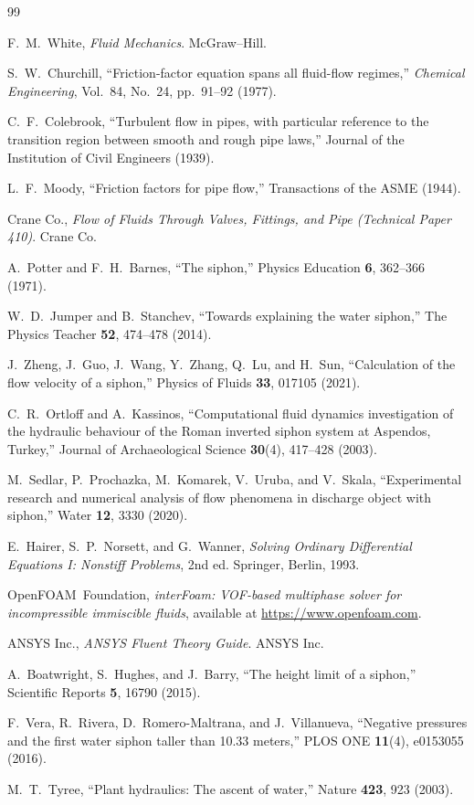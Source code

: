 \documentclass[11pt]{article}
\begin{document}
\begin{thebibliography}{99}

F.~M.~White,
\emph{Fluid Mechanics}.
McGraw--Hill.


S.~W.~Churchill,
``Friction-factor equation spans all fluid-flow regimes,''
\emph{Chemical Engineering}, Vol.~84, No.~24, pp.~91--92 (1977).


C.~F.~Colebrook,
``Turbulent flow in pipes, with particular reference to the transition region
between smooth and rough pipe laws,''
Journal of the Institution of Civil Engineers (1939).

L.~F.~Moody,
``Friction factors for pipe flow,''
Transactions of the ASME (1944).

Crane Co.,
\emph{Flow of Fluids Through Valves, Fittings, and Pipe (Technical Paper 410)}.
Crane Co.

A.~Potter and F.~H.~Barnes,
``The siphon,''
Physics Education \textbf{6}, 362--366 (1971).

W.~D.~Jumper and B.~Stanchev,
``Towards explaining the water siphon,''
The Physics Teacher \textbf{52}, 474--478 (2014).

J.~Zheng, J.~Guo, J.~Wang, Y.~Zhang, Q.~Lu, and H.~Sun,
``Calculation of the flow velocity of a siphon,''
Physics of Fluids \textbf{33}, 017105 (2021).

C.~R.~Ortloff and A.~Kassinos,
``Computational fluid dynamics investigation of the hydraulic behaviour of the Roman inverted siphon system at Aspendos, Turkey,''
Journal of Archaeological Science \textbf{30}(4), 417--428 (2003).

M.~Sedlar, P.~Prochazka, M.~Komarek, V.~Uruba, and V.~Skala,
``Experimental research and numerical analysis of flow phenomena in discharge object with siphon,''
Water \textbf{12}, 3330 (2020).

E.~Hairer, S.~P.~Norsett, and G.~Wanner,
\emph{Solving Ordinary Differential Equations I: Nonstiff Problems}, 2nd ed.
Springer, Berlin, 1993.

OpenFOAM~Foundation,
\emph{interFoam: VOF-based multiphase solver for incompressible immiscible fluids},
available at \url{https://www.openfoam.com}.

ANSYS Inc.,
\emph{ANSYS Fluent Theory Guide}.
ANSYS Inc.

A.~Boatwright, S.~Hughes, and J.~Barry,
``The height limit of a siphon,''
Scientific Reports \textbf{5}, 16790 (2015).

F.~Vera, R.~Rivera, D.~Romero-Maltrana, and J.~Villanueva,
``Negative pressures and the first water siphon taller than 10.33 meters,''
PLOS ONE \textbf{11}(4), e0153055 (2016).

M.~T.~Tyree,
``Plant hydraulics: The ascent of water,''
Nature \textbf{423}, 923 (2003).

\end{thebibliography}
\end{document}
